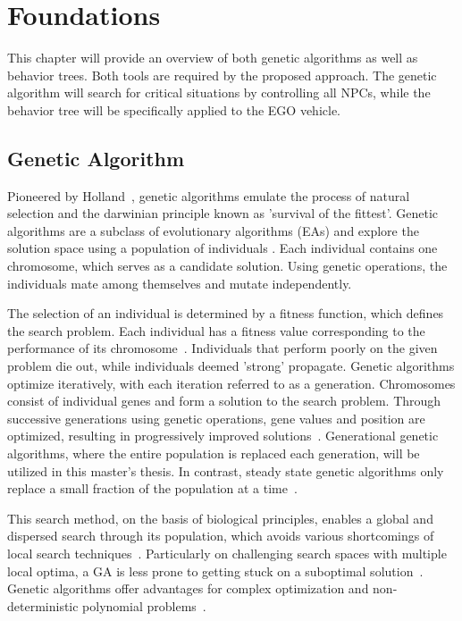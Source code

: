 \chapter{Foundations}
\label{chap:foundations}
This chapter will provide an overview of both genetic algorithms as well as behavior trees. Both tools are required by the proposed approach. The genetic algorithm will search for critical situations by controlling all NPCs, while the behavior tree will be specifically applied to the EGO vehicle.

\section{Genetic Algorithm}
\label{sect:foundations:genetic_algorithm}
Pioneered by Holland~\cite{holland_adaptation_1992}, genetic algorithms emulate the process of natural selection and the darwinian principle known as 'survival of the fittest'. Genetic algorithms are a subclass of evolutionary algorithms (EAs) and explore the solution space using a population of individuals \cite{mills_determining_2015}. Each individual contains one chromosome, which serves as a candidate solution. Using genetic operations, the individuals mate among themselves and mutate independently. 

The selection of an individual is determined by a fitness function, which defines the search problem. Each individual has a fitness value corresponding to the performance of its chromosome~\cite{majumdar_genetic_2015}. Individuals that perform poorly on the given problem die out, while individuals deemed 'strong' propagate. Genetic algorithms optimize iteratively, with each iteration referred to as a generation. Chromosomes consist of individual genes and form a solution to the search problem. Through successive generations using genetic operations, gene values and position are optimized, resulting in progressively improved solutions~\cite{srinivas_genetic_1994}. Generational genetic algorithms, where the entire population is replaced each generation, will be utilized in this master's thesis. In contrast, steady state genetic algorithms only replace a small fraction of the population at a time~\cite{srinivas_genetic_1994}.

This search method, on the basis of biological principles, enables a global and dispersed search through its population, which avoids various shortcomings of local search techniques~\cite{grefenstette_optimization_1986}. Particularly on challenging search spaces with multiple local optima, a GA is less prone to getting stuck on a suboptimal solution~\cite{majumdar_genetic_2015, katoch_review_2021, xia_genetic_2019}. Genetic algorithms offer advantages for complex optimization and non-deterministic polynomial problems~\cite{hussain_trade-off_2020}.


